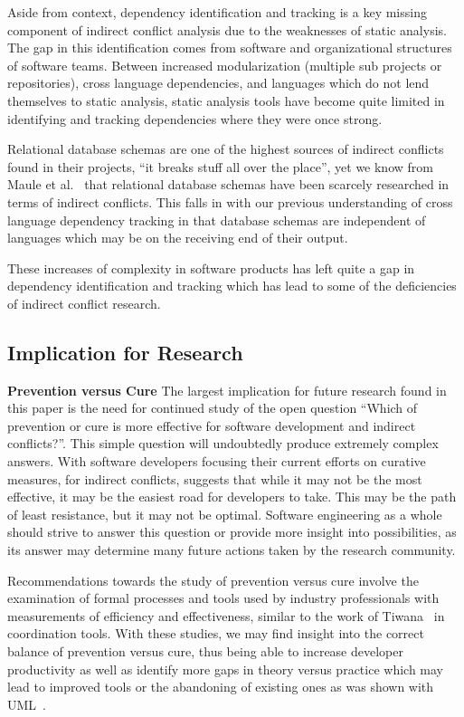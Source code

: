 \documentclass[conference]{IEEEtran}
\begin{document}
Aside from context, dependency identification and tracking is a key missing component of
indirect conflict analysis due to the weaknesses of static analysis. The gap in this identification comes from software and 
organizational structures of software teams. Between increased modularization (multiple sub projects or repositories), 
cross language dependencies, and languages which do not lend themselves to static analysis, static analysis tools have 
become quite limited in identifying and tracking dependencies where they were once strong.

Relational database schemas are one of the highest sources of indirect
conflicts found in their projects, ``it breaks stuff all over the place'',
yet we know from Maule et al.~\cite{Maule:2008:IAD} that relational database schemas have 
been scarcely researched in terms of indirect conflicts. This falls in with our previous understanding of cross language
dependency tracking in that database schemas are independent of languages which may be on the receiving end of their output.

These increases of complexity in software products has left quite a gap in dependency identification and tracking which 
has lead to some of the deficiencies of indirect conflict research.


\subsection{Implication for Research}
\label{sec:implr}

\textbf{Prevention versus Cure}
The largest implication for future research found in this paper is the need for continued study of the open question
``Which of prevention or cure is more effective for software development and indirect conflicts?''. This simple question will undoubtedly 
produce extremely complex answers. With software developers focusing their current efforts on curative measures, for
indirect conflicts, suggests
that while it may not be the most effective, it may be the easiest road for developers to take. This may be the path of
least resistance, but it may not be optimal. Software engineering as a whole should strive to answer this question or
provide more insight into possibilities, as its answer may determine many future actions taken by the research community.

Recommendations towards the study of prevention versus cure involve the examination of formal processes and tools used
by industry professionals with measurements of efficiency and effectiveness, similar to the work of
Tiwana~\cite{Tiwana:2008:ICD} in coordination tools. With these studies, we may find insight into the correct balance
of prevention versus cure, thus being able to increase developer productivity as well as identify more gaps in theory 
versus practice which may lead to improved tools or the abandoning of existing ones as was shown with UML~\cite{Petre:2013:UP}.
\end{document}
